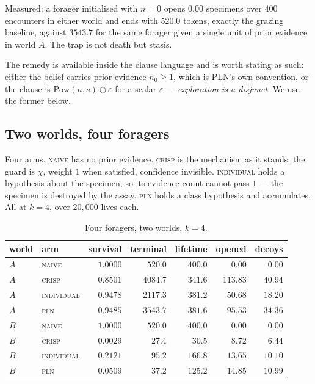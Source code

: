 \documentclass[11pt,a4paper]{article}
\theoremstyle{plain}
\theoremstyle{definition}
\theoremstyle{remark}
\newcommand{\sumv}{\oplus}
\begin{document}
Measured: a forager initialised with $n = 0$ opens $0.00$ specimens over $400$
encounters in either world and ends with $520.0$ tokens, exactly the grazing
baseline, against $3543.7$ for the same forager given a single unit of prior
evidence in world $A$. The trap is not death but stasis.

The remedy is available inside the clause language and is worth stating as such:
either the belief carries prior evidence $n_0 \geq 1$, which is PLN's own
convention, or the clause is $\mathrm{Pow}(n,s) \sumv \varepsilon$ for a scalar
$\varepsilon$ --- \emph{exploration is a disjunct}. We use the former below.

\subsection{Two worlds, four foragers}

Four arms. \textsc{naive} has no prior evidence. \textsc{crisp} is the mechanism
as it stands: the guard is $\chi$, weight $1$ when satisfied, confidence
invisible. \textsc{individual} holds a hypothesis about the specimen, so its
evidence count cannot pass $1$ --- the specimen is destroyed by the assay.
\textsc{pln} holds a class hypothesis and accumulates. All at $k = 4$, over
$20{,}000$ lives each.

\begin{table}[h]
\centering
\small
\begin{tabular}{@{}llrrrrr@{}}
\toprule
world & arm & survival & terminal & lifetime & opened & decoys \\
\midrule
$A$ & \textsc{naive} & $1.0000$ & $520.0$ & $400.0$ & $0.00$ & $0.00$ \\
$A$ & \textsc{crisp} & $0.8501$ & $\mathbf{4084.7}$ & $341.6$ & $113.83$ & $40.94$ \\
$A$ & \textsc{individual} & $0.9478$ & $2117.3$ & $381.2$ & $50.68$ & $18.20$ \\
$A$ & \textsc{pln} & $\mathbf{0.9485}$ & $3543.7$ & $381.6$ & $95.53$ & $34.36$ \\
\midrule
$B$ & \textsc{naive} & $1.0000$ & $\mathbf{520.0}$ & $400.0$ & $0.00$ & $0.00$ \\
$B$ & \textsc{crisp} & $0.0029$ & $27.4$ & $30.5$ & $8.72$ & $6.44$ \\
$B$ & \textsc{individual} & $0.2121$ & $95.2$ & $166.8$ & $13.65$ & $10.10$ \\
$B$ & \textsc{pln} & $0.0509$ & $37.2$ & $125.2$ & $14.85$ & $10.99$ \\
\bottomrule
\end{tabular}
\caption{Four foragers, two worlds, $k=4$.}\label{tab:forager}
\end{table}
\end{document}
